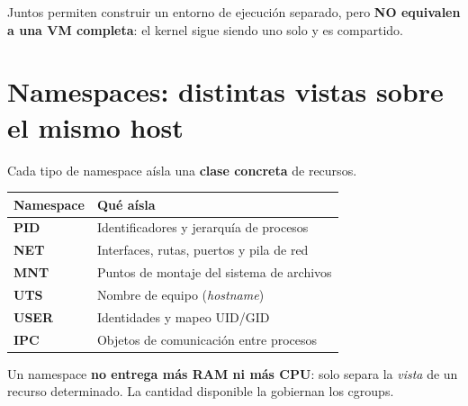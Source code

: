\documentclass[11pt,a4paper]{article}
\begin{document}
\begin{center}
\end{center}

\begin{errorbox}
Juntos permiten construir un entorno de ejecución separado, pero \textbf{NO equivalen a una
VM completa}: el kernel sigue siendo uno solo y es compartido.
\end{errorbox}

\section{Namespaces: distintas vistas sobre el mismo host}

Cada tipo de namespace aísla una \textbf{clase concreta} de recursos.

\begin{center}
\renewcommand{\arraystretch}{1.35}
\begin{tabularx}{\textwidth}{@{}>{\bfseries}l >{\raggedright\arraybackslash}X@{}}
\toprule
\textbf{\normalfont\color{azulprof} Namespace} & \textbf{\color{azulprof} Qué aísla} \\
\midrule
PID   & Identificadores y jerarquía de procesos \\
NET   & Interfaces, rutas, puertos y pila de red \\
MNT   & Puntos de montaje del sistema de archivos \\
UTS   & Nombre de equipo (\emph{hostname}) \\
USER  & Identidades y mapeo UID/GID \\
IPC   & Objetos de comunicación entre procesos \\
\bottomrule
\end{tabularx}
\end{center}

\begin{clave}
Un namespace \textbf{no entrega más RAM ni más CPU}: solo separa la \emph{vista} de un
recurso determinado. La cantidad disponible la gobiernan los cgroups.
\end{clave}
\end{document}
